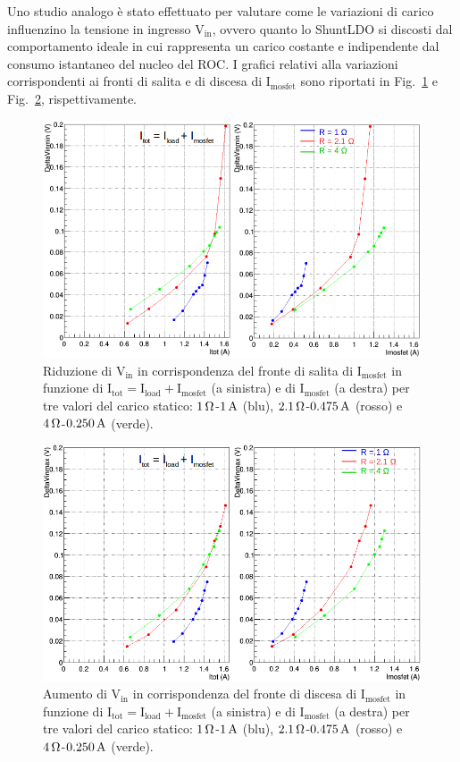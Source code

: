 Uno studio analogo \`e stato effettuato per valutare come le variazioni di carico influenzino la tensione in ingresso $\mathrm{V_{in}}$, ovvero quanto lo ShuntLDO si discosti dal comportamento ideale in cui rappresenta un carico costante e indipendente dal consumo istantaneo del nucleo del ROC. I grafici relativi alla variazioni corrispondenti ai fronti di salita e di discesa di $\mathrm{I_{mosfet}}$ sono riportati in Fig.~\ref{VinUnd} e Fig.~\ref{VinOver}, rispettivamente. 
\begin{figure}
\centering
\includegraphics[width=0.9\linewidth]{Immagini/VinUnd}
\caption{Riduzione di $\mathrm{V_{in}}$ in corrispondenza del fronte di salita di $\mathrm{I_{mosfet}}$ in funzione di $\mathrm{I_{tot} = I_{load}+I_{mosfet}}$ (a sinistra) e di $\mathrm{I_{mosfet}}$ (a destra) per tre valori del carico statico: $1{\rm \, \Omega}$-$1\rm \, A$ (blu), $2.1{\rm \, \Omega}$-$0.475\rm \, A$ (rosso) e $4{\rm \, \Omega}$-$0.250\rm \, A$ (verde). }
\label{VinUnd}
\end{figure}
\begin{figure}
\centering
\includegraphics[width=0.9\linewidth]{Immagini/VinOver}
\caption{Aumento di $\mathrm{V_{in}}$ in corrispondenza del fronte di discesa di $\mathrm{I_{mosfet}}$ in funzione di $\mathrm{I_{tot} = I_{load}+I_{mosfet}}$ (a sinistra) e di $\mathrm{I_{mosfet}}$ (a destra) per tre valori del carico statico: $1{\rm \, \Omega}$-$1\rm \, A$ (blu), $2.1{\rm \, \Omega}$-$0.475\rm \, A$ (rosso) e $4{\rm \, \Omega}$-$0.250\rm \, A$ (verde).}
\label{VinOver}
\end{figure}
